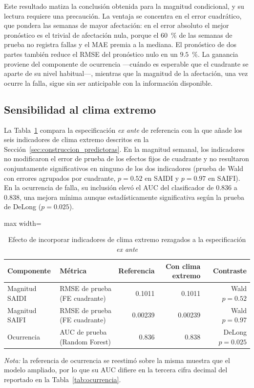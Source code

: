 Este resultado matiza la conclusión obtenida para la magnitud condicional, y su lectura requiere una precaución. La ventaja se concentra en el error cuadrático, que pondera las semanas de mayor afectación: en el error absoluto el mejor pronóstico es el trivial de afectación nula, porque el $60$~\% de las semanas de prueba no registra fallas y el MAE premia a la mediana. El pronóstico de dos partes también reduce el RMSE del pronóstico nulo en un $9{.}5$~\%. La ganancia proviene del componente de ocurrencia ---cuándo es esperable que el cuadrante se aparte de su nivel habitual---, mientras que la magnitud de la afectación, una vez ocurre la falla, sigue sin ser anticipable con la información disponible.

\subsection{Sensibilidad al clima extremo}
\label{sec:resultados_clima_extremo}

La Tabla~\ref{tab:clima_extremo} compara la especificación \emph{ex ante} de referencia con la que añade los seis indicadores de clima extremo descritos en la Sección~\ref{sec:construccion_predictoras}. En la magnitud semanal, los indicadores no modificaron el error de prueba de los efectos fijos de cuadrante y no resultaron conjuntamente significativos en ninguno de los dos indicadores (prueba de Wald con errores agrupados por cuadrante, $p=0{.}52$ en SAIDI y $p=0{.}97$ en SAIFI). En la ocurrencia de falla, su inclusión elevó el AUC del clasificador de $0{.}836$ a $0{.}838$, una mejora mínima aunque estadísticamente significativa según la prueba de DeLong ($p=0{.}025$).

\begin{table}[!htbp]
\centering
\small
\caption{Efecto de incorporar indicadores de clima extremo rezagados a la especificación \emph{ex ante}}
\label{tab:clima_extremo}
\begin{adjustbox}{max width=\linewidth}
\begin{tabular}{l l r r r}
\toprule
\textbf{Componente} & \textbf{Métrica} & \textbf{Referencia} & \textbf{Con clima extremo} & \textbf{Contraste} \\
\midrule
Magnitud SAIDI & RMSE de prueba (FE cuadrante) & 0.1011 & 0.1011 & Wald $p=0{.}52$ \\
Magnitud SAIFI & RMSE de prueba (FE cuadrante) & 0.00239 & 0.00239 & Wald $p=0{.}97$ \\
Ocurrencia     & AUC de prueba (Random Forest) & 0.836 & 0.838 & DeLong $p=0{.}025$ \\
\bottomrule
\end{tabular}
\end{adjustbox}

\vspace{2pt}
\noindent\footnotesize\textit{Nota:} la referencia de ocurrencia se reestimó sobre la misma muestra que el modelo ampliado, por lo que su AUC difiere en la tercera cifra decimal del reportado en la Tabla~\ref{tab:ocurrencia}.
\end{table}

